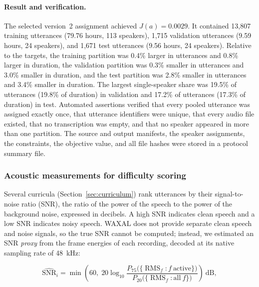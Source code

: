 \paragraph{Result and verification.}
The selected version~2 assignment achieved $J(a) = 0.0029$. It contained 13,807
training utterances (79.76 hours, 113 speakers), 1,715 validation utterances
(9.59 hours, 24 speakers), and 1,671 test utterances (9.56 hours, 24 speakers).
Relative to the targets, the training partition was 0.4\% larger in utterances
and 0.8\% larger in duration, the validation partition was 0.3\% smaller in
utterances and 3.0\% smaller in duration, and the test partition was 2.8\% smaller
in utterances and 3.4\% smaller in duration. The largest single-speaker share was
19.5\% of utterances (19.8\% of duration) in validation and 17.2\% of utterances
(17.3\% of duration) in test. Automated assertions verified that every pooled
utterance was assigned exactly once, that utterance identifiers were unique, that
every audio file existed, that no transcription was empty, and that no speaker
appeared in more than one partition. The source and output manifests, the
speaker assignments, the constraints, the objective value, and all file hashes
were stored in a protocol summary file.

\subsubsection{Acoustic measurements for difficulty scoring}
\label{sec:snr}

Several curricula (Section~\ref{sec:curriculum}) rank utterances by their
signal-to-noise ratio (SNR), the ratio of the power of the speech to the power of
the background noise, expressed in decibels. A high SNR indicates clean speech
and a low SNR indicates noisy speech. WAXAL does not provide separate clean speech
and noise signals, so the true SNR cannot be computed; instead, we estimated an
SNR \emph{proxy} from the frame energies of each recording, decoded at its native
sampling rate of 48~kHz:

\begin{equation}
    \widehat{\mathrm{SNR}}_i = \min\!\left(60,\;
    20\log_{10}\frac{P_{75}\big(\{\operatorname{RMS}_f : f~\text{active}\}\big)}
    {P_{20}\big(\{\operatorname{RMS}_f : \text{all}~f\}\big)}\right)~\text{dB},
    \label{eq:snr-proxy}
\end{equation}

